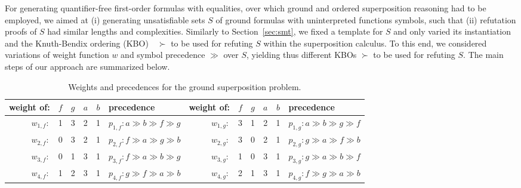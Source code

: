 For generating quantifier-free first-order formulas with equalities,
over which ground and ordered superposition reasoning had to be employed, we
aimed at (i)  generating  unsatisfiable sets $S$ of ground formulas with
uninterpreted functions symbols, such that (ii)  refutation proofs
of $S$ had similar lengths and complexities. Similarly to
Section~\ref{sec:smt}, we fixed a template for $S$  and only varied
its instantiation and
the Knuth-Bendix ordering (KBO)~\cite{Knuth1970}~$\succ$ to be used for refuting  $S$
within the superposition calculus. To this end, we considered
variations of weight function $w$ and symbol precedence $\gg$ over $S$,
yielding thus different KBOs $\succ$ to be used for refuting $S$.
The main steps of our approach are summarized below.\smallskip


\begin{table}[t]
\begin{center}
\begin{tabular}{r@{\hskip 0.5em}c c c c@{\hskip 0.5em} |@{\hskip 0.5em} l@{\hskip 1em} ||@{\hskip 0.5em} r@{\hskip 0.5em} c c c c@{\hskip 0.5em} |@{\hskip 0.5em} l}
  weight of: & $f$ & $g$ & $a$ & $b$ & precedence
  & weight of: & $f$ & $g$ & $a$ & $b$ & precedence \\ \hline
  $w_{1,f}:$  & 1   & 3   & 2   & 1   & $p_{1,f}: a \gg b \gg f \gg g$ &
  $w_{1,g}:$  & 3   & 1   & 2   & 1   & $p_{1,g}: a \gg b \gg g \gg f$ \\ \hline
  $w_{2,f}:$  & 0   & 3   & 2   & 1   & $p_{2,f}: f \gg a \gg g \gg b$ &
  $w_{2,g}:$  & 3   & 0   & 2   & 1   & $p_{2,g}: g \gg a \gg f \gg b$ \\ \hline
  $w_{3,f}:$  & 0   & 1   & 3   & 1   & $p_{3,f}: f \gg a \gg b \gg g$ &
  $w_{3,g}:$  & 1   & 0   & 3   & 1   & $p_{3,g}: g \gg a \gg b \gg f$ \\ \hline
  $w_{4,f}:$  & 1   & 2   & 3   & 1   & $p_{4,f}: g \gg f \gg a \gg b$ &
  $w_{4,g}:$  & 2   & 1   & 3   & 1   & $p_{4,g}: f \gg g \gg a \gg b$ 
\end{tabular}
\vspace*{0.3em}
\caption{Weights and precedences for the ground superposition problem.}
\label{tab:ground-sup-wp}
\end{center}\vspace*{-2em}
\end{table}

